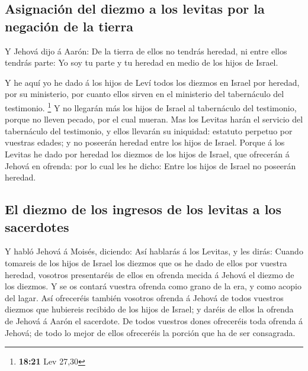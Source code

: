 \hypertarget{asignaciuxf3n-del-diezmo-a-los-levitas-por-la-negaciuxf3n-de-la-tierra}{%
\subsection{Asignación del diezmo a los levitas por la negación de la
tierra}\label{asignaciuxf3n-del-diezmo-a-los-levitas-por-la-negaciuxf3n-de-la-tierra}}

 Y Jehová dijo á Aarón: De la tierra de ellos no tendrás
heredad, ni entre ellos tendrás parte: Yo soy tu parte y tu heredad en
medio de los hijos de Israel.

 Y he aquí yo he dado á los hijos de Leví todos los diezmos
en Israel por heredad, por su ministerio, por cuanto ellos sirven en el
ministerio del tabernáculo del testimonio. \footnote{\textbf{18:21} Lev
  27,30}  Y no llegarán más los hijos de Israel al
tabernáculo del testimonio, porque no lleven pecado, por el cual mueran.
 Mas los Levitas harán el servicio del tabernáculo del
testimonio, y ellos llevarán su iniquidad: estatuto perpetuo por
vuestras edades; y no poseerán heredad entre los hijos de Israel.
 Porque á los Levitas he dado por heredad los diezmos de
los hijos de Israel, que ofrecerán á Jehová en ofrenda: por lo cual les
he dicho: Entre los hijos de Israel no poseerán heredad.

\hypertarget{el-diezmo-de-los-ingresos-de-los-levitas-a-los-sacerdotes}{%
\subsection{El diezmo de los ingresos de los levitas a los
sacerdotes}\label{el-diezmo-de-los-ingresos-de-los-levitas-a-los-sacerdotes}}

 Y habló Jehová á Moisés, diciendo:  Así
hablarás á los Levitas, y les dirás: Cuando tomareis de los hijos de
Israel los diezmos que os he dado de ellos por vuestra heredad, vosotros
presentaréis de ellos en ofrenda mecida á Jehová el diezmo de los
diezmos.  Y se os contará vuestra ofrenda como grano de la
era, y como acopio del lagar.  Así ofreceréis también
vosotros ofrenda á Jehová de todos vuestros diezmos que hubiereis
recibido de los hijos de Israel; y daréis de ellos la ofrenda de Jehová
á Aarón el sacerdote.  De todos vuestros dones ofreceréis
toda ofrenda á Jehová; de todo lo mejor de ellos ofreceréis la porción
que ha de ser consagrada.

